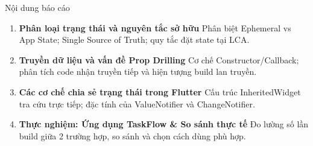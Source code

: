 \documentclass[aspectratio=169, 11pt]{beamer}
\newcommand{\currentsectionname}{}
\newcommand{\setsectionfooter}[1]{\renewcommand{\currentsectionname}{#1}}
\begin{document}
\setsectionfooter{}
\begin{frame}{Nội dung báo cáo}
  \vspace{-0.15cm}
  \begin{tcolorbox}[
    enhanced,
    colback=CodeBg,
    colframe=DarkMain,
    arc=3pt,
    left=12pt, right=12pt, top=6pt, bottom=6pt
  ]
    \fontsize{9.2pt}{13.2pt}\selectfont
    \begin{enumerate}\setlength{\itemsep}{0.12cm}
      \item \textbf{Phân loại trạng thái và nguyên tắc sở hữu}\newline
            {\footnotesize\color{TextMuted}Phân biệt Ephemeral vs App State; Single Source of Truth; quy tắc đặt state tại LCA.}
      \item \textbf{Truyền dữ liệu và vấn đề Prop Drilling}\newline
            {\footnotesize\color{TextMuted}Cơ chế Constructor/Callback; phân tích code nhận truyền tiếp và hiện tượng build lan truyền.}
      \item \textbf{Các cơ chế chia sẻ trạng thái trong Flutter}\newline
            {\footnotesize\color{TextMuted}Cấu trúc InheritedWidget tra cứu trực tiếp; đặc tính của ValueNotifier và ChangeNotifier.}
      \item \textbf{Thực nghiệm: Ứng dụng TaskFlow \& So sánh thực tế}\newline
            {\footnotesize\color{TextMuted}Đo lường số lần build giữa 2 trường hợp, so sánh và chọn cách dùng phù hợp.}
    \end{enumerate}
  \end{tcolorbox}
\end{frame}
\end{document}
